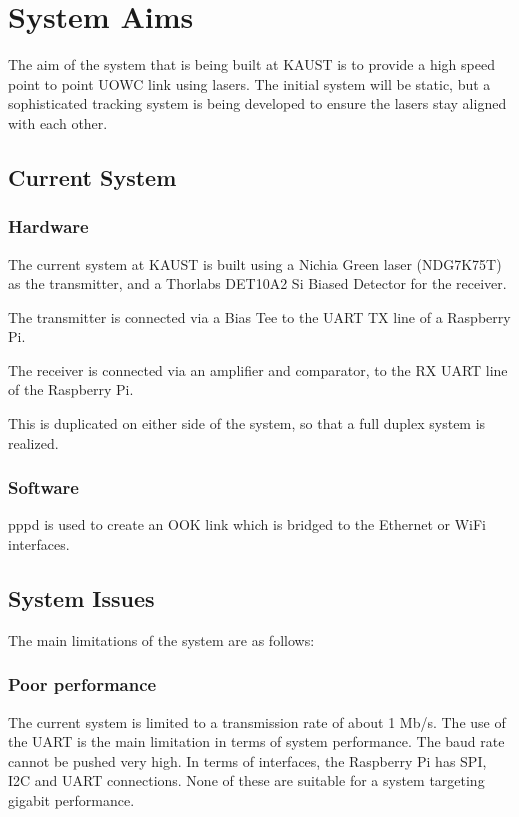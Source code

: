 \section{System Aims}
The aim of the system that is being built at \ac{KAUST} is to provide a high
speed point to point \ac{UOWC} link using lasers. The initial system will be
static, but a sophisticated tracking system is being developed to ensure the
lasers stay aligned with each other.

\subsection{Current System}

\subsubsection{Hardware}
The current system at \ac{KAUST} is built using a Nichia Green laser (NDG7K75T)
as the transmitter, and a Thorlabs DET10A2 Si Biased Detector for the receiver.

The transmitter is connected via a Bias Tee to the UART TX line of a
Raspberry Pi.

The receiver is connected via an amplifier and comparator, to the RX UART
line of the Raspberry Pi.

This is duplicated on either side of the system, so that a full duplex
system is realized.

\subsubsection{Software}
pppd is used to create an OOK link which is bridged to the Ethernet or
WiFi interfaces.

\subsection{System Issues}
The main limitations of the system are as follows:

\subsubsection{Poor performance}
The current system is limited to a transmission rate of about 1 Mb/s. The use
of the UART is the main limitation in terms of system performance. The baud
rate cannot be pushed very high. In terms of interfaces, the Raspberry Pi has
SPI, I2C and UART connections. None of these are suitable for a system
targeting gigabit performance.

